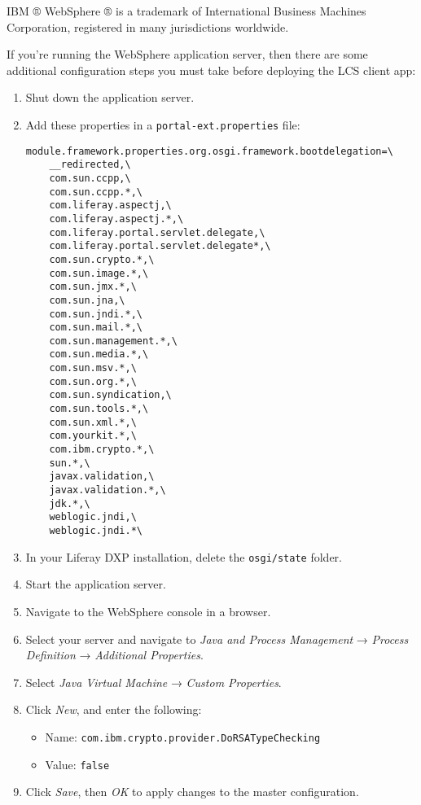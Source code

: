 IBM ® WebSphere ® is a trademark of International Business Machines
Corporation, registered in many jurisdictions worldwide.

If you're running the WebSphere application server, then there are some
additional configuration steps you must take before deploying the LCS
client app:

\begin{enumerate}
\def\labelenumi{\arabic{enumi}.}
\item
  Shut down the application server.
\item
  Add these properties in a \texttt{portal-ext.properties} file:

\begin{verbatim}
module.framework.properties.org.osgi.framework.bootdelegation=\
    __redirected,\
    com.sun.ccpp,\
    com.sun.ccpp.*,\
    com.liferay.aspectj,\
    com.liferay.aspectj.*,\
    com.liferay.portal.servlet.delegate,\
    com.liferay.portal.servlet.delegate*,\
    com.sun.crypto.*,\
    com.sun.image.*,\
    com.sun.jmx.*,\
    com.sun.jna,\
    com.sun.jndi.*,\
    com.sun.mail.*,\
    com.sun.management.*,\
    com.sun.media.*,\
    com.sun.msv.*,\
    com.sun.org.*,\
    com.sun.syndication,\
    com.sun.tools.*,\
    com.sun.xml.*,\
    com.yourkit.*,\
    com.ibm.crypto.*,\
    sun.*,\
    javax.validation,\
    javax.validation.*,\
    jdk.*,\
    weblogic.jndi,\
    weblogic.jndi.*\
\end{verbatim}
\item
  In your Liferay DXP installation, delete the \texttt{osgi/state}
  folder.
\item
  Start the application server.
\item
  Navigate to the WebSphere console in a browser.
\item
  Select your server and navigate to \emph{Java and Process Management}
  → \emph{Process Definition} → \emph{Additional Properties}.
\item
  Select \emph{Java Virtual Machine} → \emph{Custom Properties}.
\item
  Click \emph{New}, and enter the following:

  \begin{itemize}
  \tightlist
  \item
    Name: \texttt{com.ibm.crypto.provider.DoRSATypeChecking}
  \item
    Value: \texttt{false}
  \end{itemize}
\item
  Click \emph{Save}, then \emph{OK} to apply changes to the master
  configuration.
\end{enumerate}

